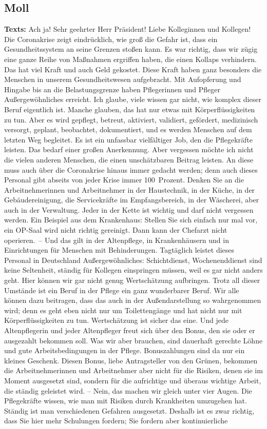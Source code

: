 \documentclass{article}
\begin{document}
\subsection{Moll}
\noindent\textbf{Texts:} Ach ja!  Sehr geehrter Herr Präsident! Liebe Kolleginnen und Kollegen! Die Coronakrise zeigt eindrücklich, wie groß die Gefahr ist, dass ein Gesundheitssystem an seine Grenzen stoßen kann. Es war richtig, dass wir zügig eine ganze Reihe von Maßnahmen ergriffen haben, die einen Kollaps verhindern. Das hat viel Kraft und auch Geld gekostet. Diese Kraft haben ganz besonders die Menschen in unserem Gesundheitswesen aufgebracht. Mit Aufopferung und Hingabe bis an die Belastungsgrenze haben Pflegerinnen und Pfleger Außergewöhnliches erreicht.  Ich glaube, viele wissen gar nicht, wie komplex dieser Beruf eigentlich ist. Manche glauben, das hat nur etwas mit Körperflüssigkeiten zu tun. Aber es wird gepflegt, betreut, aktiviert, validiert, gefördert, medizinisch versorgt, geplant, beobachtet, dokumentiert, und es werden Menschen auf dem letzten Weg begleitet. Es ist ein unfassbar vielfältiger Job, den die Pflegekräfte leisten. Das bedarf einer großen Anerkennung.  Aber vergessen möchte ich nicht die vielen anderen Menschen, die einen unschätzbaren Beitrag leisten. An diese muss auch über die Coronakrise hinaus immer gedacht werden; denn auch dieses Personal gibt abseits von jeder Krise immer 100 Prozent. Denken Sie an die Arbeitnehmerinnen und Arbeitnehmer in der Haustechnik, in der Küche, in der Gebäudereinigung, die Servicekräfte im Empfangsbereich, in der Wäscherei, aber auch in der Verwaltung. Jeder in der Kette ist wichtig und darf nicht vergessen werden. Ein Beispiel aus dem Krankenhaus: Stellen Sie sich einfach nur mal vor, ein OP-Saal wird nicht richtig gereinigt. Dann kann der Chefarzt nicht operieren. – Und das gilt in der Altenpflege, in Krankenhäusern und in Einrichtungen für Menschen mit Behinderungen. Tagtäglich leistet dieses Personal in Deutschland Außergewöhnliches: Schichtdienst, Wochenenddienst sind keine Seltenheit, ständig für Kollegen einspringen müssen, weil es gar nicht anders geht. Hier können wir gar nicht genug Wertschätzung aufbringen. Trotz all dieser Umstände ist ein Beruf in der Pflege ein ganz wunderbarer Beruf. Wir alle können dazu beitragen, dass das auch in der Außendarstellung so wahrgenommen wird; denn es geht eben nicht nur um Toilettengänge und hat nicht nur mit Körperflüssigkeiten zu tun.  Wertschätzung ist sicher das eine. Und jede Altenpflegerin und jeder Altenpfleger freut sich über den Bonus, den sie oder er ausgezahlt bekommen soll. Was wir aber brauchen, sind dauerhaft gerechte Löhne und gute Arbeitsbedingungen in der Pflege.  Bonuszahlungen sind da nur ein kleines Geschenk. Diesen Bonus, liebe Antragsteller von den Grünen, bekommen die Arbeitnehmerinnen und Arbeitnehmer  aber nicht für die Risiken, denen sie im Moment ausgesetzt sind, sondern für die aufrichtige und überaus wichtige Arbeit, die ständig geleistet wird.  – Nein, das machen wir gleich unter vier Augen. Die Pflegekräfte wissen, wie man mit Risiken durch Krankheiten umzugehen hat. Ständig ist man verschiedenen Gefahren ausgesetzt. Deshalb ist es zwar richtig, dass Sie hier mehr Schulungen fordern; Sie fordern aber kontinuierliche 
\end{document}

